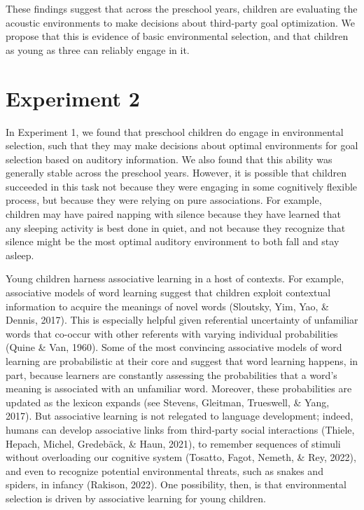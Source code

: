 \documentclass[10pt, letterpaper]{article}
\begin{document}
These findings suggest that across the preschool years, children are
evaluating the acoustic environments to make decisions about third-party
goal optimization. We propose that this is evidence of basic
environmental selection, and that children as young as three can
reliably engage in it.

\hypertarget{experiment-2}{%
\section{Experiment 2}\label{experiment-2}}

In Experiment 1, we found that preschool children do engage in
environmental selection, such that they may make decisions about optimal
environments for goal selection based on auditory information. We also
found that this ability was generally stable across the preschool years.
However, it is possible that children succeeded in this task not because
they were engaging in some cognitively flexible process, but because
they were relying on pure associations. For example, children may have
paired napping with silence because they have learned that any sleeping
activity is best done in quiet, and not because they recognize that
silence might be the most optimal auditory environment to both fall and
stay asleep.

Young children harness associative learning in a host of contexts. For
example, associative models of word learning suggest that children
exploit contextual information to acquire the meanings of novel words
(Sloutsky, Yim, Yao, \& Dennis, 2017). This is especially helpful given
referential uncertainty of unfamiliar words that co-occur with other
referents with varying individual probabilities (Quine \& Van, 1960).
Some of the most convincing associative models of word learning are
probabilistic at their core and suggest that word learning happens, in
part, because learners are constantly assessing the probabilities that a
word's meaning is associated with an unfamiliar word. Moreover, these
probabilities are updated as the lexicon expands (see Stevens, Gleitman,
Trueswell, \& Yang, 2017). But associative learning is not relegated to
language development; indeed, humans can develop associative links from
third-party social interactions (Thiele, Hepach, Michel, Gredebäck, \&
Haun, 2021), to remember sequences of stimuli without overloading our
cognitive system (Tosatto, Fagot, Nemeth, \& Rey, 2022), and even to
recognize potential environmental threats, such as snakes and spiders,
in infancy (Rakison, 2022). One possibility, then, is that environmental
selection is driven by associative learning for young children.
\end{document}
